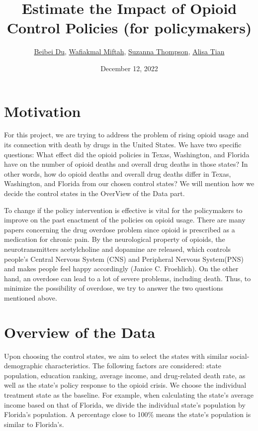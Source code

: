 \documentclass{article}
\title{Estimate the Impact of Opioid Control Policies (for policymakers)
\\
}
\author{\href{mailto:beibei.du@duke.edu}{Beibei Du}, 
\href{mailto:wafiakmal.miftah@duke.edu}{Wafiakmal Miftah},
\href{mailto:suzanna.thompson@duke.edu}{Suzanna Thompson},
\href{mailto:alisa.tian@duke.edu}{Alisa Tian}
}
\date{December 12, 2022}
\begin{document}
\maketitle
\section{Motivation}

For this project, we are trying to address the problem of rising opioid
usage and its connection with death by drugs in the United States. We
have two specific questions: What effect did the opioid policies in
Texas, Washington, and Florida have on the number of opioid deaths and
overall drug deaths in those states? In other words, how do opioid
deaths and overall drug deaths differ in Texas, Washington, and Florida
from our chosen control states? We will mention how we decide the
control states in the OverView of the Data part.

To change if the policy intervention is effective is vital for the
policymakers to improve on the past enactment of the policies on opioid
usage. There are many papers concerning the drug overdose problem since
opioid is prescribed as a medication for chronic pain. By the
neurological property of opioids, the neurotransmitters acetylcholine
and dopamine are released, which controls people's Central Nervous
System (CNS) and Peripheral Nervous System(PNS) and makes people feel
happy accordingly (Janice C. Froehlich). On the other hand, an overdose
can lead to a lot of severe problems, including death. Thus, to minimize
the possibility of overdose, we try to answer the two questions
mentioned above.

\section{Overview of the Data}

Upon choosing the control states, we aim to select the states with
similar social-demographic characteristics. The following factors are
considered: state population, education ranking, average income, and
drug-related death rate, as well as the state's policy response to the
opioid crisis. We choose the individual treatment state as the baseline.
For example, when calculating the state's average income based on that
of Florida, we divide the individual state's population by Florida's
population. A percentage close to 100\% means the state's population is
similar to Florida's.
\end{document}
